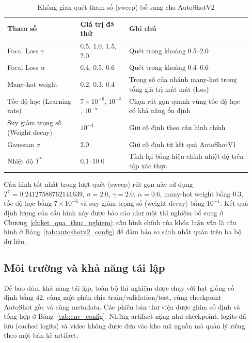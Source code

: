 \begin{table}[H]
\centering
\caption{Không gian quét tham số (sweep) bổ sung cho AutoShotV2}
\label{tab:extra_sweep_space}
\small
\begin{tabularx}{\textwidth}{L{3.5cm}L{4.2cm}X}
\toprule
\textbf{Tham số} & \textbf{Giá trị đã thử} & \textbf{Ghi chú} \\
\midrule
Focal Loss $\gamma$ & 0.5, 1.0, 1.5, 2.0 & Quét trong khoảng 0.5--2.0 \\
Focal Loss $\alpha$ & 0.4, 0.5, 0.6 & Quét trong khoảng 0.4--0.6 \\
Many-hot weight & 0.2, 0.3, 0.4 & Trọng số của nhánh many-hot trong tổng giá trị mất mát (loss) \\
Tốc độ học (Learning rate) & $7\times10^{-6}$, $10^{-3}$, $10^{-5}$ & Chọn rút gọn quanh vùng tốc độ học có khả năng ổn định \\
Suy giảm trọng số (Weight decay) & $10^{-4}$ & Giữ cố định theo cấu hình chính \\
Gaussian $\sigma$ & 2.0 & Giữ cố định từ kết quả AutoShotV1 \\
Nhiệt độ $T^*$ & 0.1--10.0 & Tính lại bằng hiệu chỉnh nhiệt độ trên tập xác thực \\
\bottomrule
\end{tabularx}
\end{table}

Cấu hình tốt nhất trong lượt quét (sweep) rút gọn này sử dụng $T^*=0.24127588762141639$, $\sigma=2.0$, $\gamma=2.0$, $\alpha=0.6$, many-hot weight bằng $0.3$, tốc độ học bằng $7\times10^{-6}$ và suy giảm trọng số (weight decay) bằng $10^{-4}$. Kết quả định lượng của cấu hình này được báo cáo như một thí nghiệm bổ sung ở Chương~\ref{ch:ket_qua_thuc_nghiem}; cấu hình chính của khóa luận vẫn là cấu hình ở Bảng~\ref{tab:autoshotv2_config} để đảm bảo so sánh nhất quán trên ba bộ dữ liệu.

\subsection{Môi trường và khả năng tái lập}
\label{sec:env_repro}

Để bảo đảm khả năng tái lập, toàn bộ thí nghiệm được chạy với hạt giống cố định bằng $42$, cùng một phân chia train/validation/test, cùng checkpoint AutoShot gốc và cùng metadata. Các phiên bản thư viện được ghim cố định và tổng hợp ở Bảng~\ref{tab:env_config}. Những artifact nặng như checkpoint, logits đã lưu (cached logits) và video không được đưa vào kho mã nguồn mà quản lý riêng theo một bản kê artifact.


